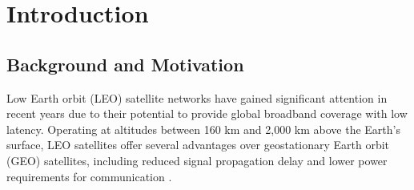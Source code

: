 \chapter{Introduction}

\section{Background and Motivation} 
\quad Low Earth orbit (LEO) satellite networks have gained significant attention in recent years due to their potential to provide global broadband coverage with low latency. Operating at altitudes between 160 km and 2,000 km above the Earth's surface, LEO satellites offer several advantages over geostationary Earth orbit (GEO) satellites, including reduced signal propagation delay and lower power requirements for communication \cite{lei2019broadband}. %

